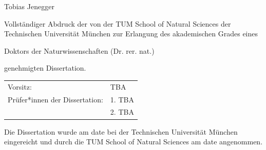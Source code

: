 \documentclass[12pt,twoside]{article}
\begin{document}
\begin{titlepage}
{  %
  
  {Tobias Jenegger}
  
  \vspace*{2\baselineskip} %

	Vollständiger Abdruck der von der TUM School of Natural Sciences der Technischen
	Universität München zur Erlangung des akademischen Grades eines

	\vspace*{2ex}
	Doktors der Naturwissenschaften (Dr. rer. nat.)
	\vspace*{2ex}

	genehmigten Dissertation.

  \vspace*{\fill}

% 
% 
% 

  	\begin{tabularx}{1.0\textwidth}{XX}
	Vorsitz:	&	TBA \\
	Prüfer*innen der Dissertation:	&	1. TBA \\
							        &	2. TBA \\
							
	\end{tabularx}


	\vspace*{\fill}

	Die Dissertation wurde am date bei der Technischen Universität München
	eingereicht und durch die TUM School of Natural Sciences am date angenommen.

  \vspace*{\fill}

  \null
  \vfill

}
\end{titlepage}
\end{document}
